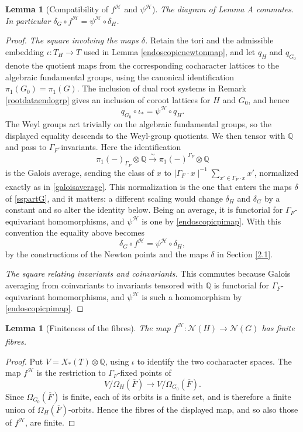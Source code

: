 \documentclass[11pt,a4paper]{article}
\theoremstyle{definition}
\theoremstyle{plain}
\newtheorem{Le}[shared]{Lemma}
\theoremstyle{remark}
\theoremstyle{plain}
\begin{document}
\begin{Le}[Compatibility of $f^{\mathcal H}$ and $\psi^{\mathcal H}$]\label{endoscopiccompatibility}
    The diagram of Lemma A commutes. In particular $\delta_G\circ f^{\mathcal H}=\psi^{\mathcal H}\circ\delta_H$.
\end{Le}
\begin{proof}
    \textit{The square involving the maps $\delta$.} Retain the tori and the admissible embedding $\iota:T_H\xrightarrow[]{}T$ used in Lemma \ref{endoscopicnewtonmap}, and let $q_H$ and $q_{G_0}$ denote the quotient maps from the corresponding cocharacter lattices to the algebraic fundamental groups, using the canonical identification $\pi_1(G_0)=\pi_1(G)$. The inclusion of dual root systems in Remark \ref{rootdataendogrp} gives an inclusion of coroot lattices for $H$ and $G_0$, and hence
    $$q_{G_0}\circ\iota_*=\psi^{\mathcal H}\circ q_H.$$
    The Weyl groups act trivially on the algebraic fundamental groups, so the displayed equality descends to the Weyl-group quotients. We then tensor with $\mathbb{Q}$ and pass to $\Gamma_F$-invariants. Here the identification
    $$\pi_1(-)_{\Gamma_F} \otimes \mathbb{Q} \xrightarrow[]{\sim} \pi_1(-)^{\Gamma_F} \otimes \mathbb{Q}$$
    is the Galois average, sending the class of $x$ to $\mid \Gamma_F \cdot x \mid^{-1} \sum_{x' \in \Gamma_F \cdot x} x'$, normalized exactly as in \ref{galoisaverage}. This normalization is the one that enters the maps $\delta$ of \ref{sspartG}, and it matters: a different scaling would change $\delta_H$ and $\delta_G$ by a constant and so alter the identity below. Being an average, it is functorial for $\Gamma_F$-equivariant homomorphisms, and $\psi^{\mathcal H}$ is one by \ref{endoscopicpimap}. With this convention the equality above becomes
    $$\delta_G\circ f^{\mathcal H}=\psi^{\mathcal H}\circ\delta_H,$$
    by the constructions of the Newton points and the maps $\delta$ in Section \ref{2.1}.

    \textit{The square relating invariants and coinvariants.} This commutes because Galois averaging from coinvariants to invariants tensored with $\mathbb Q$ is functorial for $\Gamma_F$-equivariant homomorphisms, and $\psi^{\mathcal H}$ is such a homomorphism by \ref{endoscopicpimap}.
\end{proof}

\begin{Le}[Finiteness of the fibres]\label{endoscopicfinitefibres}
    The map $f^{\mathcal H}: \mathcal{N}(H) \xrightarrow[]{} \mathcal{N}(G)$ has finite fibres.
\end{Le}
\begin{proof}
    Put $V=X_*(T)\otimes\mathbb Q$, using $\iota$ to identify the two cocharacter spaces. The map $f^{\mathcal H}$ is the restriction to $\Gamma_F$-fixed points of
    $$V/\Omega_H(\overline F)\longrightarrow V/\Omega_{G_0}(\overline F).$$
    Since $\Omega_{G_0}(\overline F)$ is finite, each of its orbits is a finite set, and is therefore a finite union of $\Omega_H(\overline F)$-orbits. Hence the fibres of the displayed map, and so also those of $f^{\mathcal H}$, are finite.
\end{proof}
\end{document}
